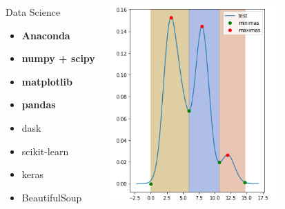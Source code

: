 \documentclass{beamer}
\begin{document}
\begin{frame}
\begin{center}
\begin{columns}[onlytextwidth,T]
\column{\dimexpr\linewidth-65mm-5mm}
\begin{block}{Data Science}
\begin{itemize}
\pause
\item \textbf{Anaconda}
\pause
\item \textbf{numpy + scipy}
\pause
\item \textbf{matplotlib}
\pause
\item \textbf{pandas}
\pause
\item dask
\pause
\item scikit-learn
\pause
\item keras
\pause
\item BeautifulSoup
\end{itemize}
\end{block}
\column{65mm}
\includegraphics[width=65mm]{./assets/pyplot.png}
\end{columns}
\end{center}
\end{frame}
\end{document}
